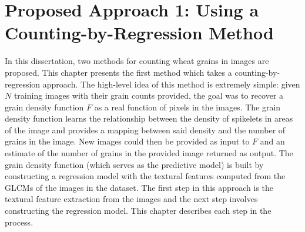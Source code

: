 



\def\baselinestretch{1}

\chapter{Proposed Approach 1: Using a Counting-by-Regression Method}

\def\baselinestretch{1.66}



In this dissertation, two methods for counting wheat grains in images are proposed. This chapter presents the first method which takes a counting-by-regression approach. The high-level idea of this method is extremely simple: given $N$ training images with their grain counts provided, the goal was to recover a grain density function $F$ as a real function of pixels in the images. The grain density function learns the relationship between the density of spikelets in areas of the image and provides a mapping between said density and the number of grains in the image. New images could then be provided as input to $F$ and an estimate of the number of grains in the provided image returned as output. The grain density function (which serves as the predictive model) is built by constructing a regression model with the textural features computed from the GLCMs of the images in the dataset. The first step in this approach is the textural feature extraction from the images and the next step involves constructing the regression model. This chapter describes each step in the process.

\bigskip

\goodbreak
